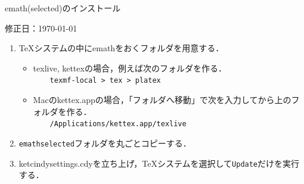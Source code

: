 \documentclass{ujarticle}
\begin{document}
\begin{center}
emath(selected)のインストール
\end{center}

\vspace{-5mm}

\hfill 修正日：\today

\begin{enumerate}[\bf\large 1.]
\item \TeX システムの中にemathをおくフォルダを用意する．
   \begin{itemize}
   \item texlive, kettexの場合，例えば次のフォルダを作る．\\
　　\verb|texmf-local > tex > platex|
   \item Macのkettex.appの場合，「フォルダへ移動」で次を入力してから上のフォルダを作る．\\
　　\verb|/Applications/kettex.app/texlive|
   \end{itemize}

\item \verb|emathselected|フォルダを丸ごとコピーする．
\item ketcindysettings.cdyを立ち上げ，TeXシステムを選択して\verb|Update|だけを実行する．

\end{enumerate}
\end{document}
